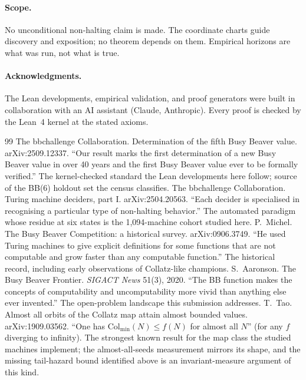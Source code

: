 \documentclass[11pt]{article}
\begin{document}
\paragraph{Scope.} No unconditional non-halting claim is made. The
coordinate charts guide discovery and exposition; no theorem depends on
them. Empirical horizons are what was run, not what is true.

\paragraph{Acknowledgments.} The Lean developments, empirical
validation, and proof generators were built in collaboration with an AI
assistant (Claude, Anthropic). Every proof is checked by the Lean~4
kernel at the stated axioms.

\begin{thebibliography}{99}\small
{} The bbchallenge Collaboration.
Determination of the fifth Busy Beaver value. arXiv:2509.12337.
``Our result marks the first determination of a new Busy Beaver
value in over 40 years and the first Busy Beaver value ever to be
formally verified.'' The kernel-checked standard the Lean
developments here follow; source of the BB(6) holdout set the
census classifies.
 The bbchallenge Collaboration.
Turing machine deciders, part I. arXiv:2504.20563.
``Each decider is specialised in recognising a particular type of
non-halting behavior.'' The automated paradigm whose residue at six
states is the 1{,}094-machine cohort studied here.
 P.~Michel. The Busy Beaver Competition: a
historical survey. arXiv:0906.3749.
``He used Turing machines to give explicit definitions for some
functions that are not computable and grow faster than any
computable function.'' The historical record, including early
observations of Collatz-like champions.
 S.~Aaronson. The Busy Beaver Frontier.
\emph{SIGACT News} 51(3), 2020.
``The BB function makes the concepts of computability and
uncomputability more vivid than anything else ever invented.''
The open-problem landscape this submission addresses.
 T.~Tao. Almost all orbits of the Collatz map
attain almost bounded values. arXiv:1909.03562.
``One has $\mathrm{Col}_{\min}(N) \le f(N)$ for almost all $N$''
(for any $f$ diverging to infinity). The strongest known result for
the map class the studied machines implement; the almost-all-seeds
measurement mirrors its shape, and the missing tail-hazard bound
identified above is an invariant-measure argument of this kind.

\end{thebibliography}
\end{document}
